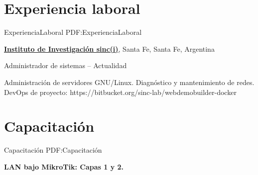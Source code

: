 \documentclass[letterpaper,MMMyyyy,nonstop]{simpleresumecv}
\begin{document}
\begin{body}

%
%


\section
{Experiencia\newline
laboral}
{ExperienciaLaboral}
{PDF:ExperienciaLaboral}

\href{http://www.sinc.unl.edu.ar}
{\textbf{Instituto de Investigación sinc(i)}},
Santa Fe, Santa Fe, Argentina

\GapNoBreak
\BulletItem
Administrador de sistemas
\hfill
{} --
Actualidad
\begin{detail}
\SubBulletItem
Administración de servidores GNU/Linux.
\SubBulletItem
Diagnóstico y mantenimiento de redes.
\SubBulletItem
DevOps de proyecto: https://bitbucket.org/sinc-lab/webdemobuilder-docker
\end{detail}


\section
{Capacitación}
{Capacitación}
{PDF:Capacitación}


\textbf{LAN bajo MikroTik: Capas 1 y 2.}
\hfill
{}


\end{body}
\end{document}
